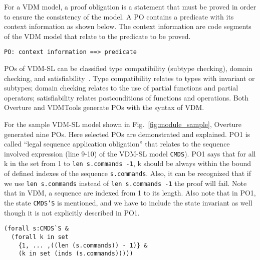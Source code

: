 
For a VDM model, a proof obligation is a statement that must be proved in order to ensure the consistency of the model. A PO contains a predicate with its context information as shown below. The context information are code segments of the VDM model that relate to the predicate to be proved.

\begin{mdframed}[roundcorner=5pt]
\begin{Verbatim}[fontsize=\small]
PO: context information ==> predicate
\end{Verbatim}
\end{mdframed}

POs of VDM-SL can be classified type compatibility (subtype checking), domain checking, and satisfiability~\cite{AL:97:POGV,Vermolen:2010:PCV:1774088.1774608}. Type compatibility relates to types with invariant or subtypes; domain checking relates to the use of partial functions and partial operators; satisfiability relates postconditions of functions and operations. Both Overture and VDMTools generate POs with the syntax of VDM.

For the sample VDM-SL model shown in Fig.~\ref{fig:module_sample}, Overture generated nine POs. Here selected POs are demonstrated and explained. PO1 is called ``legal sequence application obligation'' that relates to the sequence involved expression (line 9-10) of the VDM-SL model {\tt CMDS}). PO1 says that for all k in the set from 1 to {\tt len s.commands -1}, k should be always within the bound of defined indexes of the sequence {\tt s.commands}. Also, it can be recognized that if we use {\tt len s.commands} instead of {\tt len s.commands -1} the proof will fail. Note that in VDM, a sequence are indexed from 1 to its length. Also note that in PO1, the state {\tt CMDS'S} is mentioned, and we have to include the state invariant as well though it is not explicitly described in PO1.

\begin{mdframed}[roundcorner=5pt]
\begin{Verbatim}[fontsize=\small]
(forall s:CMDS`S & 
  (forall k in set 
    {1, ... ,((len (s.commands)) - 1)} & 
    (k in set (inds (s.commands)))))
\end{Verbatim}
\end{mdframed}

